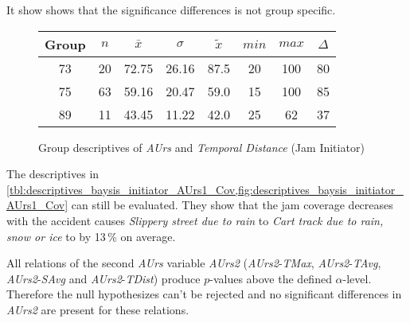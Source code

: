 It show shows that the significance differences is not group specific.
\begin{figure}[ht!]
	\centering
	\begin{minipage}{0.5\textwidth}
		\tiny
		\setlength{\tabcolsep}{4pt}
		\centering
		\begin{tabular}{c|c|c|c|c|c|c|c}
			\toprule
			Group & $n$ & $\bar{x}$ & $\sigma$ & $\tilde{x}$ & $min$ & $max$ & $\Delta$ \\
			\midrule
			73 & 20 & 72.75 & 26.16 & 87.5 & 20 & 100 & 80 \\ 
			75 & 63 & 59.16 & 20.47 & 59.0 & 15 & 100 & 85 \\ 
			89 & 11 & 43.45 & 11.22 & 42.0 & 25 & 62  & 37 \\ 
			\bottomrule
		\end{tabular}
		\label{tbl:descriptives_baysis_initiator_AUrs1_Cov}
	\end{minipage}%
	\begin{minipage}{0.55\textwidth}
		\data 
        \pgfplotstablesort[sort key=mean, sort cmp=float >]{\datasorted}{\data}
        \tiny
        \centering
		\label{fig:descriptives_baysis_initiator_AUrs1_Cov}
	\end{minipage}%
	\caption{Group descriptives of \textit{AUrs} and \textit{Temporal Distance} (Jam Initiator)}
\end{figure}
The descriptives in \cref{tbl:descriptives_baysis_initiator_AUrs1_Cov,fig:descriptives_baysis_initiator_AUrs1_Cov} can still be evaluated. They show that the jam coverage decreases with the accident causes \textit{Slippery street due to rain} to \textit{Cart track due to rain, snow or ice} to by 13\,\% on average.

\medskip
All relations of the second \textit{AUrs} variable \textit{AUrs2} (\textit{AUrs2}-\textit{TMax}, \textit{AUrs2}-\textit{TAvg}, \textit{AUrs2}-\textit{SAvg} and \textit{AUrs2}-\textit{TDist}) produce $p$-values above the defined $\alpha$-level. Therefore the null hypothesizes can't be rejected and no significant differences in \textit{AUrs2} are present for these relations.

